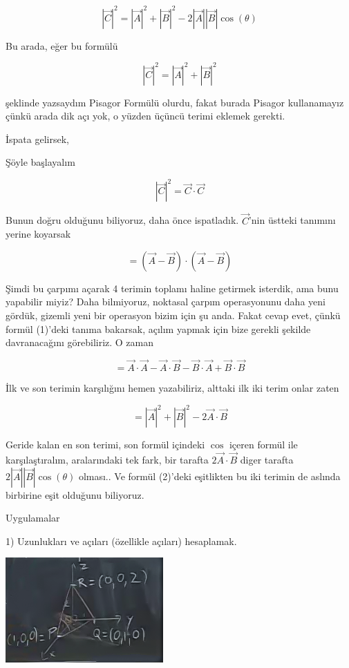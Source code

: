 \documentclass[12pt,fleqn]{article}\usepackage{../../common}
\begin{document}
$$ |\vec{C}|^2 = |\vec{A}|^2 + |\vec{B}|^2 - 2|\vec{A}||\vec{B}|\cos(\theta) $$

Bu arada, eğer bu formülü 

$$ |\vec{C}|^2 = |\vec{A}|^2 + |\vec{B}|^2  $$

şeklinde yazsaydım Pisagor Formülü olurdu, fakat burada Pisagor kullanamayız
çünkü arada dik açı yok, o yüzden üçüncü terimi eklemek gerekti.

İspata gelirsek,

Şöyle başlayalım

$$ |\vec{C}|^2 = \vec{C} \cdot \vec{C} $$

Bunun doğru olduğunu biliyoruz, daha önce ispatladık. $\vec{C}$'nin
üstteki tanımını yerine koyarsak

$$ = (\vec{A} - \vec{B}) \cdot (\vec{A} - \vec{B})  $$

Şimdi bu çarpımı açarak 4 terimin toplamı haline getirmek isterdik, ama bunu
yapabilir miyiz? Daha bilmiyoruz, noktasal çarpım operasyonunu daha yeni gördük,
gizemli yeni bir operasyon bizim için şu anda. Fakat cevap evet, çünkü formül
(1)'deki tanıma bakarsak, açılım yapmak için bize gerekli şekilde davranacağını
görebiliriz. O zaman

$$  =
\vec{A}\cdot\vec{A} - 
\vec{A}\cdot\vec{B} -
\vec{B}\cdot\vec{A} +
\vec{B}\cdot\vec{B} 
$$

İlk ve son terimin karşılığını hemen yazabiliriz, alttaki ilk iki terim
onlar zaten

$$ = |\vec{A}|^2 + |\vec{B}|^2 - 2\vec{A} \cdot \vec{B} $$

Geride kalan en son terimi, son formül içindeki $\cos$ içeren formül ile
karşılaştıralım, aralarındaki tek fark, bir tarafta $2\vec{A} \cdot \vec{B}$
diger tarafta $2|\vec{A}||\vec{B}|\cos(\theta)$ olması.. Ve formül (2)'deki
eşitlikten bu iki terimin de aslında birbirine eşit olduğunu biliyoruz.

Uygulamalar

1) Uzunlukları ve açıları (özellikle açıları) hesaplamak.

\includegraphics[height=4cm]{1_12.png}
\end{document}
